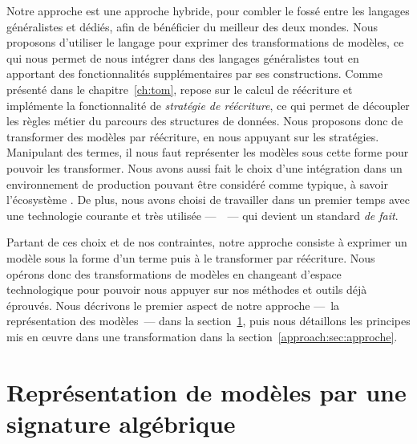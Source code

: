 Notre approche est une approche hybride, pour combler le fossé entre les
langages généralistes et dédiés, afin de bénéficier du meilleur des deux
mondes. Nous proposons d'utiliser le langage {\tom} pour exprimer des
transformations de modèles, ce qui nous permet de nous intégrer dans des
langages généralistes tout en apportant des fonctionnalités supplémentaires par
ses constructions. Comme présenté dans le chapitre~\ref{ch:tom}, {\tom} repose
sur le calcul de réécriture et implémente la fonctionnalité de \emph{stratégie
de réécriture}, ce qui permet de découpler les règles métier du parcours des
structures de données. Nous proposons donc de transformer des modèles par
réécriture, en nous appuyant sur les stratégies. Manipulant des termes, il nous
faut représenter les modèles sous cette forme pour pouvoir les transformer.
Nous avons aussi fait le choix d'une intégration dans un environnement de
production pouvant être considéré comme typique, à savoir l'écosystème {\java}.
De plus, nous avons choisi de travailler dans un premier temps avec une
technologie courante et très utilisée ---~{\emf}~--- qui devient un standard
\emph{de fait}.

Partant de ces choix et de nos contraintes, notre approche consiste à exprimer
un modèle {\emf} sous la forme d'un terme puis à le transformer par réécriture.
Nous opérons donc des transformations de modèles en changeant d'espace
technologique pour pouvoir nous appuyer sur nos méthodes et outils déjà
éprouvés. Nous décrivons le premier aspect de notre approche ---~la
représentation des modèles~--- dans la
section~\ref{approach:sec:representation}, puis nous détaillons les principes
mis en œuvre dans une transformation dans la
section~\ref{approach:sec:approche}.

%

\section{Représentation de modèles par une signature algébrique}
\label{approach:sec:representation}


